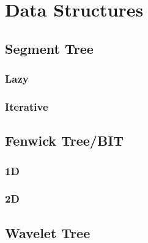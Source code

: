 \documentclass[../Notes/main.tex]{subfiles}
\begin{document}
\section{Data Structures}

\subsection{Segment Tree}

\subsubsection{Lazy}


\subsubsection{Iterative}


\subsection{Fenwick Tree/BIT}
\subsubsection{1D}


\subsubsection{2D}
%

\subsection{Wavelet Tree}

\end{document}
